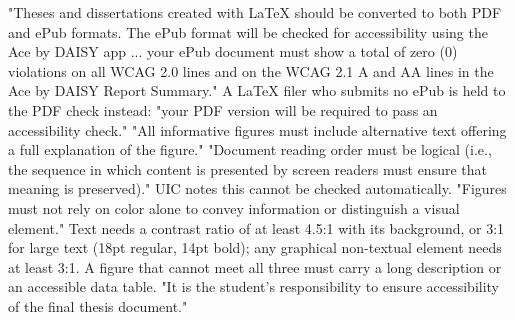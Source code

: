 	{"Theses and dissertations created with LaTeX should be converted to both
	 PDF and ePub formats. The ePub format will be checked for accessibility
	 using the Ace by DAISY app ... your ePub document must show a total of zero
	 (0) violations on all WCAG 2.0 lines and on the WCAG 2.1 A and AA lines in
	 the Ace by DAISY Report Summary." A LaTeX filer who submits no ePub is held
	 to the PDF check instead: "your PDF version will be required to pass an
	 accessibility check."}
	{"All informative figures must include alternative text offering a full
	 explanation of the figure."}
	{"Document reading order must be logical (i.e., the sequence in which
	 content is presented by screen readers must ensure that meaning is
	 preserved)." UIC notes this cannot be checked automatically.}
	{"Figures must not rely on color alone to convey information or distinguish
	 a visual element." Text needs a contrast ratio of at least 4.5:1 with its
	 background, or 3:1 for large text (18pt regular, 14pt bold); any graphical
	 non-textual element needs at least 3:1. A figure that cannot meet all three
	 must carry a long description or an accessible data table.}
	{"It is the student's responsibility to ensure accessibility of the final
	 thesis document."}


